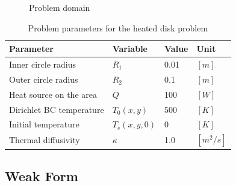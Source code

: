 \begin{figure}[h!]
	\centering
	\caption{\label{fig::Domain} Problem domain}
\end{figure}

\renewcommand{\arraystretch}{2}
\begin{table}[h!]
	\begin{center}
		\begin{tabular}{ p{5cm} p{2cm} p{1.5cm} p{1.5cm}}
			\toprule
			Parameter & Variable & Value & Unit\\
			\hline
			Inner circle radius & $R_1$ & 0.01 & $[m]$\\
			Outer circle radius & $R_2$ & 0.1 & $[m]$\\
			Heat source on the area & $Q$ & 100 & $[W]$\\
			Dirichlet BC temperature & $T_0(x,y)$ & 500 & $[K]$\\
			Initial temperature & $T_s(x,y,0)$ & 0 & $[K]$\\
			Thermal diffusivity & $\kappa$ & 1.0 & $[m^2/s]$\\
			\bottomrule
		\end{tabular}
		\caption{\label{tab:parameters} Problem parameters for the heated disk problem}
	\end{center}
\end{table}
\renewcommand{\arraystretch}{1}

\subsection{Weak Form}

